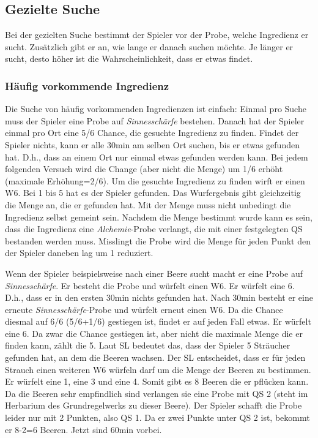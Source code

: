 \subsection{Gezielte Suche}
Bei der gezielten Suche bestimmt der Spieler vor der Probe, welche Ingredienz er sucht. Zusätzlich gibt er an, wie lange er danach suchen möchte. Je länger er sucht, desto höher ist die Wahrscheinlichkeit, dass er etwas findet. 

\subsubsection{Häufig vorkommende Ingredienz}
Die Suche von häufig vorkommenden Ingredienzen ist einfach: Einmal pro Suche muss der Spieler eine Probe auf \textit{Sinnesschärfe} bestehen. Danach hat der Spieler einmal pro Ort eine 5/6 Chance, die gesuchte Ingredienz zu finden. Findet der Spieler nichts, kann er alle 30min am selben Ort suchen, bis er etwas gefunden hat. D.h., dass an einem Ort nur einmal etwas gefunden werden kann. Bei jedem folgenden Versuch wird die Change (aber nicht die Menge) um 1/6 erhöht (maximale Erhöhung=2/6). Um die gesuchte Ingredienz zu finden wirft er einen W6. Bei 1 bis 5 hat es der Spieler gefunden. Das Wurfergebnis gibt gleichzeitig die Menge an, die er gefunden hat. Mit der Menge muss nicht unbedingt die Ingredienz selbst gemeint sein. Nachdem die Menge bestimmt wurde kann es sein, dass die Ingredienz eine \textit{Alchemie}-Probe verlangt, die mit einer festgelegten QS bestanden werden muss. Misslingt die Probe wird die Menge für jeden Punkt den der Spieler daneben lag um 1 reduziert.

Wenn der Spieler beispielsweise nach einer Beere sucht macht er eine Probe auf \textit{Sinnesschärfe}. Er besteht die Probe und würfelt einen W6. Er würfelt eine 6. D.h., dass er in den ersten 30min nichts gefunden hat. Nach 30min besteht er eine erneute \textit{Sinnesschärfe}-Probe und würfelt erneut einen W6. Da die Chance diesmal auf 6/6 (5/6+1/6) gestiegen ist, findet er auf jeden Fall etwas. Er würfelt eine 6. Da zwar die Chance gestiegen ist, aber nicht die maximale Menge die er finden kann, zählt die 5. Laut SL bedeutet das, dass der Spieler 5 Sträucher gefunden hat, an dem die Beeren wachsen. Der SL entscheidet, dass er für jeden Strauch einen weiteren W6 würfeln darf um die Menge der Beeren zu bestimmen. Er würfelt eine 1, eine 3 und eine 4. Somit gibt es 8 Beeren die er pflücken kann. Da die Beeren sehr empfindlich sind verlangen sie eine Probe mit QS 2 (steht im Herbarium des Grundregelwerks zu dieser Beere). Der Spieler schafft die Probe leider nur mit 2 Punkten, also QS 1. Da er zwei Punkte unter QS 2 ist, bekommt er 8-2=6 Beeren. Jetzt sind 60min vorbei.

